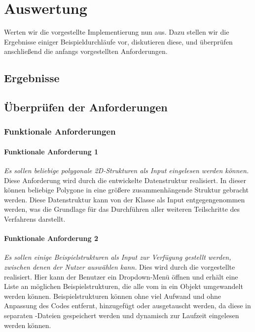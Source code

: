 %
\chapter{Auswertung}
Werten wir die vorgestellte Implementierung nun aus. Dazu stellen wir die Ergebnisse einiger Beispieldurchläufe vor, diskutieren diese, und überprüfen
anschließend die anfangs vorgestellten Anforderungen.

\section{Ergebnisse}

\section{Überprüfen der Anforderungen}
\subsection{Funktionale Anforderungen}
\subsubsection{Funktionale Anforderung 1}
\textit{Es sollen beliebige polygonale 2D-Strukturen als Input eingelesen werden können.} Diese Anforderung wird
durch die entwickelte  Datenstruktur realisiert. In dieser können beliebige Polygone in eine größere zusammenhängende
Struktur gebracht werden. Diese Datenstruktur kann von der  Klasse als Input entgegengenommen werden, was die
Grundlage für das Durchführen aller weiteren Teilschritte des Verfahrens darstellt.

\subsubsection{Funktionale Anforderung 2}
\textit{Es sollen einige Beispielstrukturen als Input zur Verfügung gestellt werden, zwischen denen der Nutzer auswählen kann.}
Dies wird durch die vorgestellte  realisiert. Hier kann der Benutzer ein Dropdown-Menü öffnen und erhält eine Liste an
möglichen Beispielstrukturen, die alle vom  in ein  Objekt umgewandelt werden können.
Beispielstrukturen können ohne viel Aufwand und ohne Anpassung des Codes entfernt, hinzugefügt oder ausgetauscht werden, da diese in
separaten -Dateien gespeichert werden und dynamisch zur Laufzeit eingelesen werden können.

